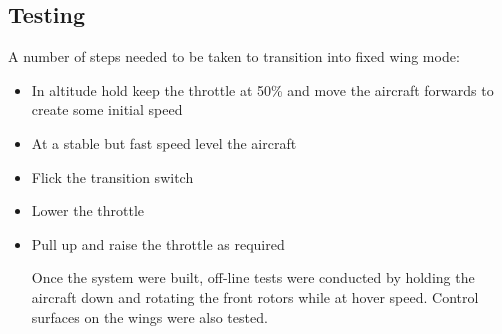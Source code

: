 \subsection{Testing}
A number of steps needed to be taken to transition into fixed wing mode: 

\begin{itemize}
\item In altitude hold keep the throttle at 50\% and move the aircraft forwards to create some initial speed
\item At a stable but fast speed level the aircraft
\item Flick the transition switch 
\item Lower the throttle
\item Pull up and raise the throttle as required

Once the system were built, off-line tests were conducted by holding the aircraft down and rotating the front rotors while at hover speed. Control surfaces on the wings were also tested. 

		
\end{itemize}
